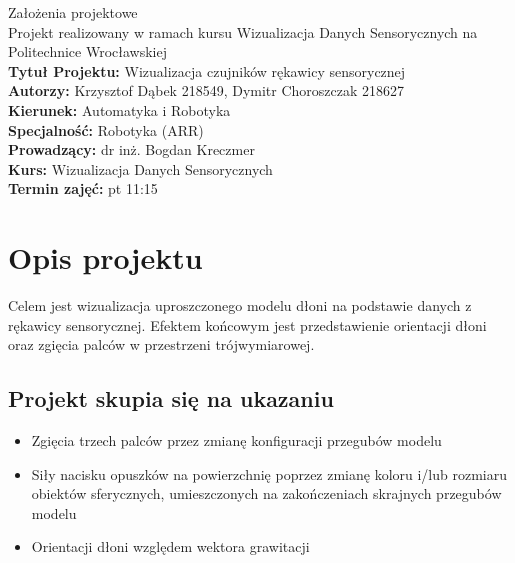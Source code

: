 \documentclass[12pt,a4paper]{article}
\begin{document}
\LARGE\centering Założenia projektowe\\
\large\centering Projekt realizowany w ramach kursu Wizualizacja Danych Sensorycznych na Politechnice Wrocławskiej\\
\vspace{5 mm}
\normalsize\flushleft\textbf{Tytuł Projektu:} Wizualizacja czujników rękawicy sensorycznej\\
\textbf{Autorzy:} Krzysztof Dąbek 218549, Dymitr Choroszczak 218627\\
\textbf{Kierunek:} Automatyka i Robotyka\\
\textbf{Specjalność:} Robotyka (ARR)\\
\textbf{Prowadzący:} dr inż. Bogdan Kreczmer\\
\textbf{Kurs:} Wizualizacja Danych Sensorycznych\\
\textbf{Termin zajęć:} pt 11:15\\
\vspace{5 mm}

\section{Opis projektu} \normalsize
Celem jest wizualizacja uproszczonego modelu dłoni na podstawie danych z rękawicy sensorycznej. 
Efektem końcowym jest przedstawienie orientacji dłoni oraz zgięcia palców w przestrzeni trójwymiarowej. \\
\vspace{1cm}
\subsection{Projekt skupia się na ukazaniu}
\begin{itemize}
\item Zgięcia trzech palców przez zmianę konfiguracji przegubów modelu
\item Siły nacisku opuszków na powierzchnię poprzez zmianę koloru i/lub rozmiaru obiektów sferycznych, umieszczonych na zakończeniach skrajnych przegubów modelu
\item Orientacji dłoni względem wektora grawitacji
\end{itemize}
\end{document}
